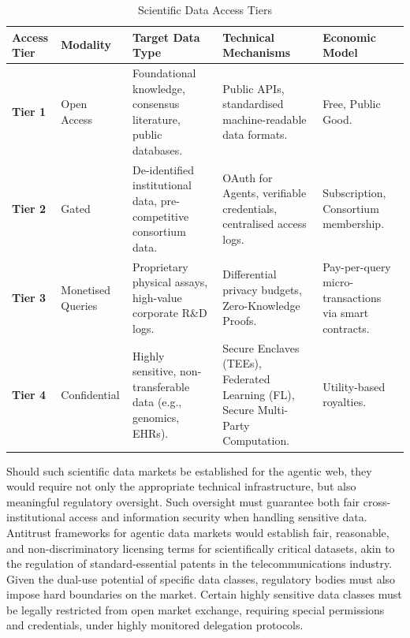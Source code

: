 \documentclass[11pt, a4paper, twocolumn, goog]{google}
\begin{document}
\begin{table}[htbp]
    \centering
    \caption{Scientific Data Access Tiers}
    \label{tab:SDAT}
    \renewcommand{\arraystretch}{1.4} %
    \begin{tabularx}{\textwidth}{@{} l l X X X @{}}
        \toprule
        \textbf{Access Tier} & \textbf{Modality} & \textbf{Target Data Type} & \textbf{Technical Mechanisms} & \textbf{Economic Model} \\
        \midrule
        
        \textbf{Tier 1} & Open Access & Foundational knowledge, consensus literature, public databases. & Public APIs, standardised machine-readable data formats. & Free, Public Good. \\
        \addlinespace
        
        \textbf{Tier 2} & Gated & De-identified institutional data, pre-competitive consortium data. & OAuth for Agents, verifiable credentials, centralised access logs. & Subscription, Consortium membership. \\
        \addlinespace
        
        \textbf{Tier 3} & Monetised Queries & Proprietary physical assays, high-value corporate R\&D logs. & Differential privacy budgets, Zero-Knowledge Proofs. & Pay-per-query micro-transactions via smart contracts. \\
        \addlinespace
        
        \textbf{Tier 4} & Confidential & Highly sensitive, non-transferable data (e.g., genomics, EHRs). & Secure Enclaves (TEEs), Federated Learning (FL), Secure Multi-Party Computation. & Utility-based royalties. \\
        
        \bottomrule
    \end{tabularx}
\end{table}

Should such scientific data markets be established for the agentic web, they would require not only the appropriate technical infrastructure, but also meaningful regulatory oversight. Such oversight must guarantee both fair cross-institutional access and information security when handling sensitive data. Antitrust frameworks for agentic data markets would establish fair, reasonable, and non-discriminatory licensing terms for scientifically critical datasets, akin to the regulation of standard-essential patents in the telecommunications industry. Given the dual-use potential of specific data classes, regulatory bodies must also impose hard boundaries on the market. Certain highly sensitive data classes must be legally restricted from open market exchange, requiring special permissions and credentials, under highly monitored delegation protocols.
\end{document}

